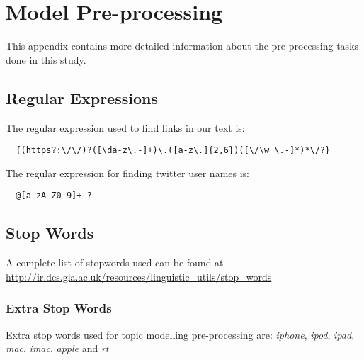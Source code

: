 \chapter{Model Pre-processing}
\label{cha:appx-model-preprocessing}
This appendix contains more detailed information about the pre-processing tasks done in this study.

\section{Regular Expressions}
\label{sec:appx-regular-expressions}
The regular expression used to find links in our text is:
\begin{verbatim}
  {(https?:\/\/)?([\da-z\.-]+)\.([a-z\.]{2,6})([\/\w \.-]*)*\/?}
\end{verbatim}

The regular expression for finding twitter user names is:
\begin{verbatim}
  @[a-zA-Z0-9]+ ?
\end{verbatim}

\section{Stop Words}
\label{sec:appx-stopwords}
A complete list of stopwords used can be found at
\url{http://ir.dcs.gla.ac.uk/resources/linguistic_utils/stop_words}

\subsection{Extra Stop Words}
\label{sec:appx-extra-stopwords}
Extra stop words used for topic modelling pre-processing are: \textit{iphone}, \textit{ipod},
\textit{ipad}, \textit{mac}, \textit{imac}, \textit{apple} and \textit{rt}


